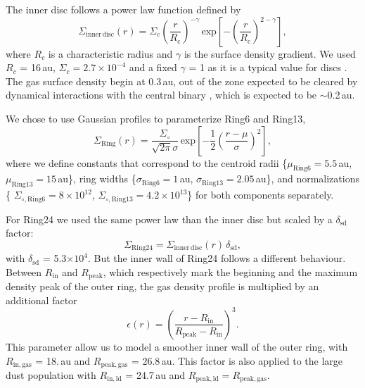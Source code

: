 \documentclass[letters,usenatbib,times]{mnras}
\begin{document}
The inner disc follows a power law function defined by
\begin{equation}
  \Sigma_{\mathrm{inner\,disc}}(r) =\Sigma_\mathrm{c} \left(\frac{r}{R_\mathrm{c}}\right)^{-\gamma}  \, \mathrm{exp}\left[-\left(\frac{r}{R_\mathrm{c}}\right)^{2-\gamma}\right],
\end{equation}
where $R_c$ is a characteristic radius and $\gamma$ is the surface density gradient. We used $R_c$ = 16\,au, $\Sigma_\mathrm{c} =2.7\times10^{-4}$ and a fixed $\gamma$ = 1 as it is a typical value for discs \citep{Andrews_2009,Andrews_2010}. The gas surface density begin at 0.3\,au, out of the zone expected to be cleared by dynamical interactions with the central binary \citep{Art_Lu}, which is expected to be $\sim$0.2\,au.

We chose to use Gaussian profiles to parameterize Ring6 and Ring13,
\begin{equation}
  \Sigma_{\mathrm{Ring}}(r) = \frac{\Sigma_\circ}{\sqrt{2 \pi} \sigma}
  \, \mathrm{exp}\left[-\frac{1}{2}\left(\frac{r-\mu}{\sigma}\right)^{2}\right],
\end{equation}
where we define constants that correspond to the centroid radii \{$\mu_{\mathrm{Ring6}}=5.5$\,au, $\mu_{\mathrm{Ring13}}=15$\,au\}, ring widths \{$\sigma_{\mathrm{Ring6}}=1$\,au, $\sigma_{\mathrm{Ring13}}=2.05$\,au\}, and normalizations \{ $\Sigma_{\circ,\mathrm{Ring6}}=8\times10^{12}$, $\Sigma_{\circ,\mathrm{Ring13}}=4.2\times10^{13}$\} for both components separately.

For Ring24 we used the same power law than the inner disc but scaled by a $\delta_{\mathrm{sd}}$ factor:
\begin{equation}
  \Sigma_{\mathrm{Ring24}} = \Sigma_{\mathrm{inner\,disc}}(r)\, \delta_{\mathrm{sd}},
\end{equation}
with $\delta_{\mathrm{sd}}$ = 5.3$\times 10^4$. But the inner wall of Ring24 follows a different behaviour. Between $R_\mathrm{in}$ and $R_\mathrm{peak}$, which respectively mark  the beginning and the maximum density peak of the outer ring, the gas density profile is multiplied by an additional factor
\begin{equation}
    \epsilon(r) = \left(\frac{ r - R_\mathrm{in}}{R_\mathrm{peak} - R_\mathrm{in}}\right)^3.
\end{equation}
This parameter allow us to model a smoother inner wall of the outer ring, with $R_\mathrm{in,gas}$ = 18.\,au and $R_\mathrm{peak,gas}$ = 26.8\,au. This factor is also applied to the large dust population with $R_\mathrm{in,ld}$ = 24.7\,au and $R_\mathrm{peak,ld} = R_\mathrm{peak,gas}$. 
\end{document}
